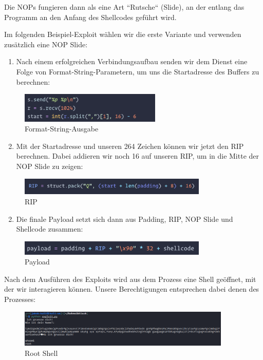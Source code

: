 Die NOPs fungieren dann als eine Art “Rutsche“ (Slide), an der entlang das Programm an den Anfang des
Shellcodes geführt wird.

\pagebreak 
Im folgenden Beispiel-Exploit wählen wir die erste Variante und verwenden zusätzlich eine NOP Slide:

\begin{enumerate}
    \item Nach einem erfolgreichen Verbindungsaufbau senden wir dem Dienst eine Folge von Format-String-Parametern, um uns die Startadresse des Buffers zu berechnen: 
\end{enumerate}
\begin{figure}[h]
    \centering
    \includegraphics[width=0.6\textwidth,height=0.75\textheight,keepaspectratio]{images/format.png}
    \caption{Format-String-Ausgabe}
\end{figure}

\begin{enumerate}
    \setcounter{enumi}{1}
    \item Mit der Startadresse und unseren 264 Zeichen können wir jetzt den RIP berechnen. Dabei addieren wir noch 16 auf unseren RIP, um in die Mitte der NOP Slide zu zeigen:
\end{enumerate}
\begin{figure}[h]
    \centering
    \includegraphics[width=0.8\textwidth,keepaspectratio]{images/rip.png}
    \caption{RIP}
\end{figure}

\begin{enumerate}
    \setcounter{enumi}{1}
    \item Die finale Payload setzt sich dann aus Padding, RIP, NOP Slide und Shellcode zusammen:
\end{enumerate}
\begin{figure}[h]
    \centering
    \includegraphics[width=0.8\textwidth,keepaspectratio]{images/payload.png}
    \caption{Payload}
\end{figure}

Nach dem Ausführen des Exploits wird aus dem Prozess eine Shell geöffnet, mit der wir interagieren können.
Unsere Berechtigungen entsprechen dabei denen des Prozesses:
\begin{figure}[h]
    \centering
    \includegraphics[width=0.9\textwidth,keepaspectratio]{images/root.png}
    \caption{Root Shell}
\end{figure}
